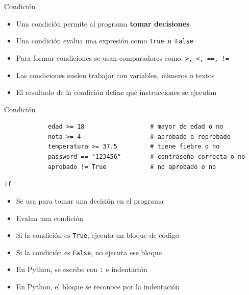 \documentclass{beamer}
\begin{document}
    \begin{frame}{Condición}
        \begin{itemize}
            \item Una condición permite al programa \textbf{tomar decisiones}
            \item Una condición evalua una expresión como \texttt{True o False}
            \item Para formar condiciones se usan comparadores como: \texttt{>, <, ==, !=}
            \item Las condiciones suelen trabajar con variables, números o textos
            \item El resultado de la condición define qué instrucciones se ejecutan
        \end{itemize}
    \end{frame}

    \begin{frame}[fragile,t]{Condición}
        \begin{verbatim}
            edad >= 18                  # mayor de edad o no
            nota >= 4                   # aprobado o reprobado
            temperatura >= 37.5         # tiene fiebre o no
            password == "123456"        # contraseña correcta o no
            aprobado != True            # no aprobado o no
        \end{verbatim}
    \end{frame}

    \begin{frame}[fragile,t]{\texttt{if}}
         \begin{itemize}
            \item Se usa para tomar una decisión en el programa
            \item Evalua una condición
            \item Si la condición es \texttt{True}, ejecuta un bloque de código
            \item Si la condición es \texttt{False}, no ejecuta ese bloque
            \item En Python, se escribe con \texttt{:} e indentación
            \item En Python, el bloque se reconoce por la indentación
         \end{itemize}
    \end{frame}
\end{document}
